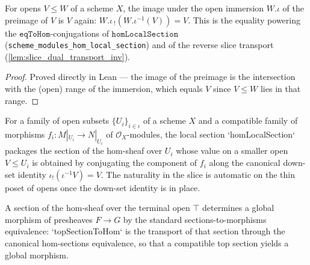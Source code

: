 \begin{lemma}\leanok
[Down-set image identity \(\iota_!(\iota^{-1}V) = V\)]
  \label{lem:image_preimage_of_le}
  For opens \(V \le W\) of a scheme \(X\), the image under the open immersion \(W.\iota\) of
  the preimage of \(V\) is \(V\) again: \(W.\iota\,{}_!(W.\iota^{-1}(V)) = V\). This is the
  equality powering the \(\mathtt{eqToHom}\)-conjugations of \(\mathtt{homLocalSection}\)
  (\texttt{scheme\_modules\_hom\_local\_section}) and of the reverse slice transport
  (\cref{lem:slice_dual_transport_inv}).
\end{lemma}
\begin{proof}




\leanok
  Proved directly in Lean --- the image of the preimage is the intersection with the
  (open) range of the immersion, which equals \(V\) since \(V \le W\) lies in that range.
\end{proof}

\begin{definition}




  \label{def:scheme_modules_hom_local_section}
  For a family of open subsets \(\{U_i\}_{i \in \iota}\) of a scheme \(X\) and a compatible
  family of morphisms \(f_i : M|_{U_i} \to N|_{U_i}\) of \(\mathcal{O}_X\)-modules, the
  local section `homLocalSection` packages the section of the hom-sheaf over \(U_i\) whose
  value on a smaller open \(V \le U_i\) is obtained by conjugating the component of \(f_i\)
  along the canonical down-set identity \(\iota_!(\iota^{-1}V) = V\). The naturality in the
  slice is automatic on the thin poset of opens once the down-set identity is in place.
\end{definition}

\begin{definition}




  \label{def:scheme_modules_top_section_to_hom}
  A section of the hom-sheaf over the terminal open \(\top\) determines a global
  morphism of presheaves \(F \to G\) by the standard sections-to-morphisms equivalence:
  `topSectionToHom` is the transport of that section through the canonical
  hom-sections equivalence, so that a compatible top section yields a global morphism.
\end{definition}

